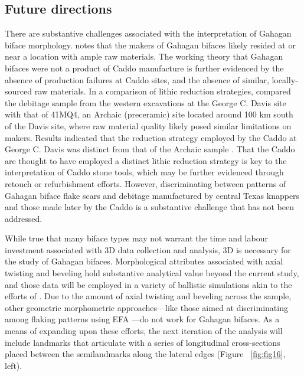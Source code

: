 \documentclass[review]{elsarticle}
\begin{document}
\subsection*{Future directions}

There are substantive challenges associated with the interpretation of Gahagan biface morphology. \citet{RN3684} notes that the makers of Gahagan bifaces likely resided at or near a location with ample raw materials. The working theory that Gahagan bifaces were not a product of Caddo manufacture is further evidenced by the absence of production failures at Caddo sites, and the absence of similar, locally-sourced raw materials. In a comparison of lithic reduction strategies, \citet{RN20701} compared the debitage sample from the western excavations at the George C. Davis site with that of 41MQ4, an Archaic (preceramic) site located around 100 km south of the Davis site, where raw material quality likely posed similar limitations on makers. Results indicated that the reduction strategy employed by the Caddo at George C. Davis was distinct from that of the Archaic sample \citep{RN20701}. That the Caddo are thought to have employed a distinct lithic reduction strategy is key to the interpretation of Caddo stone tools, which may be further evidenced through retouch or refurbishment efforts. However, discriminating between patterns of Gahagan biface flake scars and debitage manufactured by central Texas knappers \citep{RN11568} and those made later by the Caddo is a substantive challenge that has not been addressed.

While true that many biface types may not warrant the time and labour investment associated with 3D data collection and analysis, 3D is necessary for the study of Gahagan bifaces. Morphological attributes associated with axial twisting and beveling hold substantive analytical value beyond the current study, and those data will be employed in a variety of ballistic simulations akin to the efforts of \citet{RN20857}. Due to the amount of axial twisting and beveling across the sample, other geometric morphometric approaches---like those aimed at discriminating among flaking patterns using EFA  \citep{RN253,RN4143,RN11975}---do not work for Gahagan bifaces. As a means of expanding upon these efforts, the next iteration of the analysis will include landmarks that articulate with a series of longitudinal cross-sections placed between the semilandmarks along the lateral edges (Figure ~\ref{fig:fig16}, left).
\end{document}
